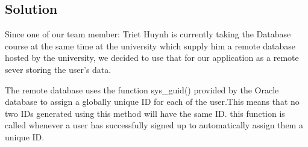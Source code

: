 \subsection{Solution}
Since one of our team member: Triet Huynh is currently taking the Database course at the same time at the university 
which  supply him a remote database hosted by the university, we decided to use that for our application as a remote 
sever  storing the user's data.

The remote database uses the function sys\_guid() provided by the Oracle database to assign a globally unique ID for
each of the user.This means that no two IDs generated using this method will have the same ID. this function is called
whenever a user has successfully signed up to automatically assign them a unique ID.\\







